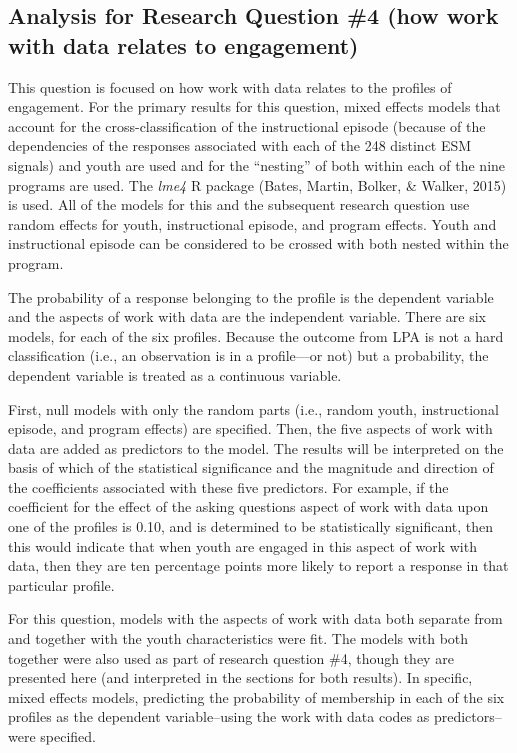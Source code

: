 \documentclass[]{msu-thesis}
\theoremstyle{definition}
\theoremstyle{definition}
\theoremstyle{definition}
\theoremstyle{remark}
\begin{document}
\subsection{Analysis for Research Question \#4 (how work with data
relates to
engagement)}\label{analysis-for-research-question-4-how-work-with-data-relates-to-engagement}

This question is focused on how work with data relates to the profiles
of engagement. For the primary results for this question, mixed effects
models that account for the cross-classification of the instructional
episode (because of the dependencies of the responses associated with
each of the 248 distinct ESM signals) and youth are used and for the
``nesting'' of both within each of the nine programs are used. The
\emph{lme4} R package (Bates, Martin, Bolker, \& Walker, 2015) is used.
All of the models for this and the subsequent research question use
random effects for youth, instructional episode, and program effects.
Youth and instructional episode can be considered to be crossed with
both nested within the program.

The probability of a response belonging to the profile is the dependent
variable and the aspects of work with data are the independent variable.
There are six models, for each of the six profiles. Because the outcome
from LPA is not a hard classification (i.e., an observation is in a
profile---or not) but a probability, the dependent variable is treated
as a continuous variable.

First, null models with only the random parts (i.e., random youth,
instructional episode, and program effects) are specified. Then, the
five aspects of work with data are added as predictors to the model. The
results will be interpreted on the basis of which of the statistical
significance and the magnitude and direction of the coefficients
associated with these five predictors. For example, if the coefficient
for the effect of the asking questions aspect of work with data upon one
of the profiles is 0.10, and is determined to be statistically
significant, then this would indicate that when youth are engaged in
this aspect of work with data, then they are ten percentage points more
likely to report a response in that particular profile.

For this question, models with the aspects of work with data both
separate from and together with the youth characteristics were fit. The
models with both together were also used as part of research question
\#4, though they are presented here (and interpreted in the sections for
both results). In specific, mixed effects models, predicting the
probability of membership in each of the six profiles as the dependent
variable--using the work with data codes as predictors--were specified.
\end{document}
